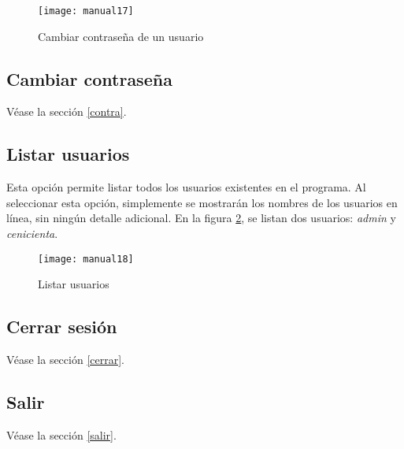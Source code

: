 \documentclass[titlepage,letterpaper,12pt]{article}
\begin{document}
\begin{figure}
  \centering
  \texttt{[image: manual17]}
  \vspace{-1cm}
  \caption{Cambiar contraseña de un usuario}
  \label{fig:m17}
\end{figure}

\subsection{Cambiar contraseña}
Véase la sección \ref{contra}.

\subsection{Listar usuarios}
Esta opción permite listar todos los usuarios existentes en el programa. Al seleccionar esta opción, simplemente se mostrarán los nombres de los usuarios en línea, sin ningún detalle adicional. En la figura \ref{fig:m18}, se listan dos usuarios: \emph{admin} y \emph{cenicienta}.

\begin{figure}
  \centering
  \texttt{[image: manual18]}
  \vspace{-1cm}
  \caption{Listar usuarios}
  \label{fig:m18}
\end{figure}

\subsection{Cerrar sesión}
Véase la sección \ref{cerrar}.

\subsection{Salir}
Véase la sección \ref{salir}.
\end{document}
